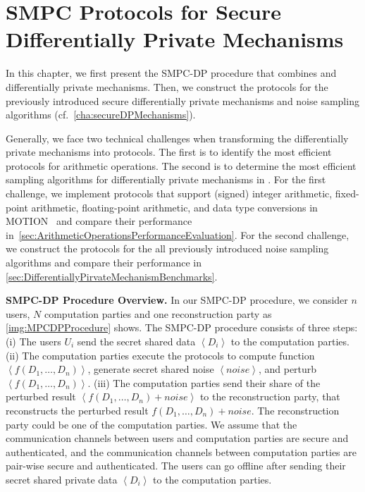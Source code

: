\chapter{SMPC Protocols for Secure Differentially Private Mechanisms}
\label{cha:MPCProtocolsforDifferentiallyPrivateMechanisms}

In this chapter, we first present the SMPC-DP procedure that combines \smpc and differentially private mechanisms.
Then, we construct the \smpc protocols for the previously introduced secure differentially private mechanisms and noise sampling algorithms (cf.~\autoref{cha:secureDPMechanisms}).

Generally, we face two technical challenges when transforming the differentially private mechanisms into \smpc protocols.
The first is to identify the most efficient \smpc protocols for arithmetic operations.
The second is to determine the most efficient sampling algorithms for differentially private mechanisms in \smpc.
For the first challenge, we implement \smpc protocols that support (signed) integer arithmetic, fixed-point arithmetic, floating-point arithmetic, and data type conversions in MOTION~\cite{braun2022motion} and compare their performance in~\autoref{sec:ArithmeticOperationsPerformanceEvaluation}.
For the second challenge, we construct the \smpc protocols for the all previously introduced noise sampling algorithms and compare their performance in \autoref{sec:DifferentiallyPirvateMechanismBenchmarks}.

\textbf{SMPC-DP Procedure Overview.}
In our SMPC-DP procedure, we consider $n$ users, $N$ computation parties and one reconstruction party as \autoref{img:MPCDPProcedure} shows.
The SMPC-DP procedure consists of three steps:
(i) The users $U_i$ send the secret shared data $\left\langle D_i\right\rangle $ to the computation parties.
(ii) The computation parties execute the \smpc protocols to compute function $\left\langle f\left(D_1,\ldots, D_n\right) \right\rangle $, generate secret shared noise $\left\langle noise\right\rangle $, and perturb $\left\langle f\left(D_1,\ldots, D_n\right) \right\rangle $.
(iii) The computation parties send their share of the perturbed result $\left\langle f\left(D_1,\ldots, D_n\right) +noise\right\rangle$ to the reconstruction party, that reconstructs the perturbed result $f\left(D_1,\ldots, D_n\right) +noise$.
The reconstruction party could be one of the computation parties. We assume that the communication channels between users and computation parties are secure and authenticated, and the communication channels between computation parties are pair-wise secure and authenticated. The users can go offline after sending their secret shared private data $\left\langle D_i\right\rangle $ to the computation parties.

